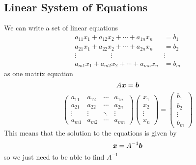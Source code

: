 \documentclass{article}
\begin{document}
    \subsection{Linear System of Equations}
    We can write a set of linear equations
    \begin{align*}
        a_{11}x_1 + a_{12}x_2 + \dotsb + a_{1n}x_n &= b_1\\
        a_{21}x_1 + a_{22}x_2 + \dotsb + a_{2n}x_n &= b_2\\
        \vdots\qquad\quad\qquad\vdots\qquad\qquad &\vdots\\
        a_{m1}x_1 + a_{m2}x_2 + \dotsb + a_{mn}x_n &= b_m
    \end{align*}
    as one matrix equation
    \[A\bm{x} = \bm{b}\]
    \begin{equation}\label{eqn:Ax=b}
        \begin{pmatrix}
            a_{11} & a_{12} & \cdots & a_{1n}\\
            a_{21} & a_{22} & \cdots & a_{2n}\\
            \vdots & \vdots & \ddots & \vdots\\
            a_{m1} & a_{m2} & \cdots & a_{mn}
        \end{pmatrix}
        \begin{pmatrix}
            x_1 \\ x_2 \\ \vdots \\ x_n
        \end{pmatrix}
        =
        \begin{pmatrix}
            b_1 \\ b_2 \\ \vdots \\ b_m
        \end{pmatrix}
    \end{equation}
    This means that the solution to the equations is given by
    \[\bm{x} = A^{-1}\bm{b}\]
    so we just need to be able to find \(A^{-1}\)
    
\end{document}
